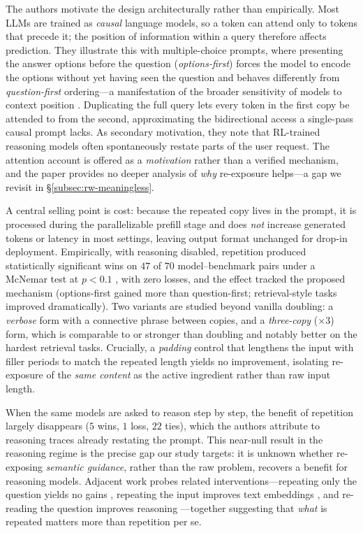 The authors motivate the design architecturally rather than empirically. Most LLMs
are trained as \emph{causal} language models, so a token can attend only to tokens
that precede it; the position of information within a query therefore affects
prediction. They illustrate this with multiple-choice prompts, where presenting the
answer options before the question (\emph{options-first}) forces the model to encode
the options without yet having seen the question and behaves differently from
\emph{question-first} ordering---a manifestation of the broader sensitivity of
models to context position \citep{liu2023lost}. Duplicating the full query lets
every token in the first copy be attended to from the second, approximating the
bidirectional access a single-pass causal prompt lacks. As secondary motivation,
they note that RL-trained reasoning models often spontaneously restate parts of the
user request. The attention account is offered as a \emph{motivation} rather than a
verified mechanism, and the paper provides no deeper analysis of \emph{why}
re-exposure helps---a gap we revisit in \S\ref{subsec:rw-meaningless}.

A central selling point is cost: because the repeated copy lives in the prompt, it
is processed during the parallelizable prefill stage and does \emph{not} increase
generated tokens or latency in most settings, leaving output format unchanged for
drop-in deployment. Empirically, with reasoning disabled, repetition produced
statistically significant wins on $47$ of $70$ model--benchmark pairs under a
McNemar test at $p<0.1$ \citep{mcnemar1947}, with zero losses, and the effect
tracked the proposed mechanism (options-first gained more than question-first;
retrieval-style tasks improved dramatically). Two variants are studied beyond
vanilla doubling: a \emph{verbose} form with a connective phrase between copies, and
a \emph{three-copy} ($\times 3$) form, which is comparable to or stronger than
doubling and notably better on the hardest retrieval tasks. Crucially, a
\emph{padding} control that lengthens the input with filler periods to match the
repeated length yields no improvement, isolating re-exposure of the \emph{same
content} as the active ingredient rather than raw input length.

When the same models are asked to reason step by step, the benefit of repetition
largely disappears ($5$ wins, $1$ loss, $22$ ties), which the authors attribute to
reasoning traces already restating the prompt. This near-null result in the
reasoning regime is the precise gap our study targets: it is unknown whether
re-exposing \emph{semantic guidance}, rather than the raw problem, recovers a
benefit for reasoning models. Adjacent work probes related interventions---repeating
only the question yields no gains \citep{shaier2024asking}, repeating the input
improves text embeddings \citep{springer2024repetition}, and re-reading the question
improves reasoning \citep{xu2024reread}---together suggesting that \emph{what} is
repeated matters more than repetition per se.

